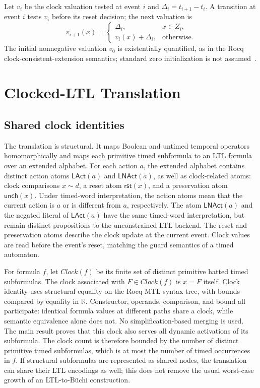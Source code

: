 \documentclass{ieeeaccess}
\newcommand{\Real}{\mathbb{R}}
\newcommand{\Reset}{\mathsf{rst}}
\newcommand{\Unch}{\mathsf{unch}}
\newcommand{\Clock}{\mathit{Clock}}
\begin{document}
Let $v_i$ be the clock valuation tested at event $i$ and
$\Delta_i=t_{i+1}-t_i$. A transition at event $i$ tests $v_i$ before its
reset decision; the next valuation is
\[
v_{i+1}(x)=
\begin{cases}
\Delta_i,&x\in Z_i,\\
v_i(x)+\Delta_i,&\text{otherwise.}
\end{cases}
\]
The initial nonnegative valuation $v_0$ is existentially quantified, as in
the Rocq clock-consistent-extension semantics; standard zero initialization
is not assumed~\cite{openai_codex}.

\section{Clocked-LTL Translation}
\label{sec:translation}
\subsection{Shared clock identities}
The translation is structural. It maps Boolean and untimed temporal
operators homomorphically and maps each primitive timed subformula to an LTL
formula over an extended alphabet. For each action $a$, the extended
alphabet contains distinct action atoms $\mathsf{LAct}(a)$ and
$\mathsf{LNAct}(a)$, as well as clock-related atoms: clock comparisons
$x\sim d$, a reset atom
$\Reset(x)$, and a preservation atom $\Unch(x)$. Under timed-word
interpretation, the action atoms mean that the current action is $a$ or is
different from $a$, respectively. The atom $\mathsf{LNAct}(a)$ and the
negated literal of $\mathsf{LAct}(a)$ have the same timed-word interpretation,
but remain distinct propositions to the unconstrained LTL backend. The reset
and preservation atoms describe the clock update at the current event. Clock
values are read before the event's reset, matching the guard semantics of a
timed automaton.

For formula $f$, let $\Clock(f)$ be its finite set of distinct primitive
hatted timed subformulas. The clock associated with $F\in\Clock(f)$ is
$x=F$ itself. Clock identity uses structural equality on the Rocq MTL syntax
tree, with bounds compared by equality in $\Real$. Constructor, operands,
comparison, and bound all participate: identical formula values at different
paths share a clock, while semantic equivalence alone does not. No
simplification-based merging is used. The main result proves that this clock
also serves all dynamic activations of its subformula.
The clock count is therefore bounded by the number of distinct primitive
timed subformulas, which is at most the number of timed occurrences in $f$.
If structural subformulas are represented as shared nodes, the translation
can share their LTL encodings as well; this does not remove the usual
worst-case growth of an LTL-to-B\"uchi construction.
\end{document}
